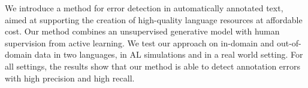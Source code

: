 We introduce a method for error detection in automatically annotated text, aimed at supporting the creation of high-quality language resources at affordable cost. Our method combines an unsupervised generative model with human supervision from active learning. We test our approach on in-domain and out-of-domain data in two languages, in AL simulations and in a real world setting. For all settings, the results show that our method is able to detect annotation errors with high precision and high recall.
